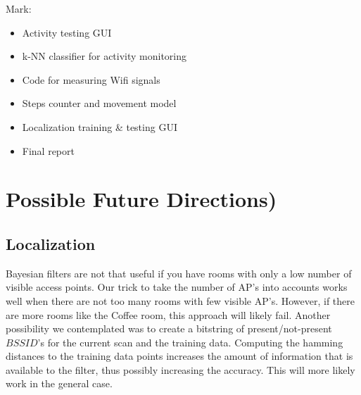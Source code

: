 \documentclass[a4paper,10pt,twoside]{IEEEtran}
\begin{document}
Mark:
\begin{itemize}
    \item Activity testing GUI
    \item k-NN classifier for activity monitoring
    \item Code for measuring Wifi signals
    \item Steps counter and movement model
    \item Localization training \& testing GUI
    \item Final report
\end{itemize}

\section{Possible Future Directions)}
\label{sec:future-directions}

\subsection{Localization}
Bayesian filters are not that useful if you have rooms with only a low number of visible access points.
Our trick to take the number of AP's into accounts works well when there
are not too many rooms with few visible AP's.
However, if there are more rooms like the Coffee room, this approach will likely fail.
Another possibility we contemplated was to create a bitstring of present/not-present $BSSID$'s for the current scan and the training data.
Computing the hamming distances to the training data points increases the amount of information that
is available to the filter, thus possibly increasing the accuracy.
This will more likely work in the general case.

%
%
\end{document}
